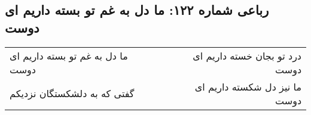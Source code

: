 \begin{center}
\section*{رباعی شماره ۱۲۲: ما دل به غم تو بسته داریم ای دوست}
\label{sec:sh122}
\begin{longtable}{l p{0.5cm} r}
ما دل به غم تو بسته داریم ای دوست
&&
درد تو بجان خسته داریم ای دوست
\\
گفتی که به دلشکستگان نزدیکم
&&
ما نیز دل شکسته داریم ای دوست
\\
\end{longtable}
\end{center}
